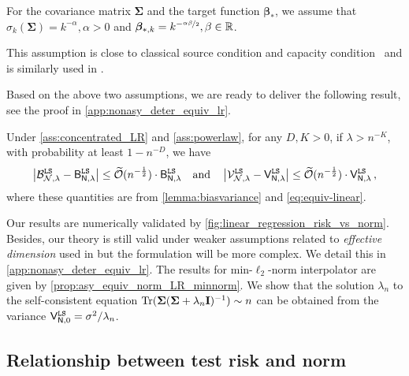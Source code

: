 \begin{assumption}\label{ass:powerlaw}
For the covariance matrix $\bm \Sigma$ and the target function $\bm \beta_*$, we assume that $ \sigma_k(\bm \Sigma) = k^{-\alpha}, \alpha >0$ and $ {\boldsymbol \beta}_{*,k} =k^{-\nicefrac{\alpha\beta}{2}},  \beta \in \mathbb{R}$.
\end{assumption}

This assumption is close to classical source condition and capacity condition~\citep{caponnetto2007optimal} and is similarly used in \citet[Assumption 1]{paquette20244+}.

Based on the above two assumptions, we are ready to deliver the following result, see the proof in \cref{app:nonasy_deter_equiv_lr}.
\begin{theorem}\label{prop:non-asy_equiv_norm_LR}
    Under \cref{ass:concentrated_LR} and \ref{ass:powerlaw}, for any $D,K >0$, if $\lambda > n^{-K}$, with probability at least $1-n^{-D}$, we have 
    \[
    \left|\mathcal{B}^{\tt LS}_{\mathcal{N},\lambda} - \mathsf B_{\mathsf N,\lambda}^{\tt LS}\right| \leq \widetilde{\mathcal{O}} (n^{-\frac{1}{2}}) \cdot \mathsf B_{\mathsf N,\lambda}^{\tt LS} \quad \text{and} \quad \left|\mathcal{V}^{\tt LS}_{\mathcal{N},\lambda} - \mathsf V_{\mathsf N,\lambda}^{\tt LS}\right| \leq \widetilde{\mathcal{O}} (n^{-\frac{1}{2}}) \cdot \mathsf V_{\mathsf N,\lambda}^{\tt LS}\,,
    \]
where these quantities are from \cref{lemma:biasvariance} and \cref{eq:equiv-linear}.
\end{theorem}
 Our results are numerically validated by \cref{fig:linear_regression_risk_vs_norm}. Besides, our theory is still valid under weaker assumptions related to \emph{effective dimension} used in \citet{misiakiewicz2024non} but the formulation will be more complex. We detail this in \cref{app:nonasy_deter_equiv_lr}.
The results for min-$\ell_2$-norm interpolator are given by \cref{prop:asy_equiv_norm_LR_minnorm}. We show that the solution $\lambda_n$ to the self-consistent equation ${\rm Tr}({\boldsymbol \Sigma}({\boldsymbol \Sigma}+\lambda_n{\mathbf I})^{-1}) \sim n$ can be obtained from the variance $\mathsf V_{\mathsf N,0}^{\tt LS}=\sigma^2/\lambda_n$.


\subsection{Relationship between test risk and norm}
\label{sec:relationship_lrr}

